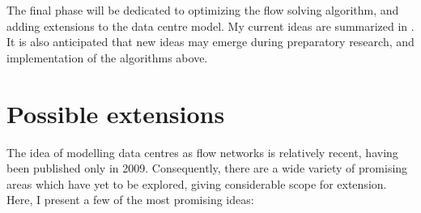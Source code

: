The final phase will be dedicated to optimizing the flow solving algorithm, and adding extensions to the data centre model. My current ideas are summarized in . It is also anticipated that new ideas may emerge during preparatory research, and implementation of the algorithms above.

\section*{Possible extensions}
\label{sec:extensions}

The idea of modelling data centres as flow networks is relatively recent, having been published only in 2009. Consequently, there are a wide variety of promising areas which have yet to be explored, giving considerable scope for extension. Here, I present a few of the most promising ideas:


